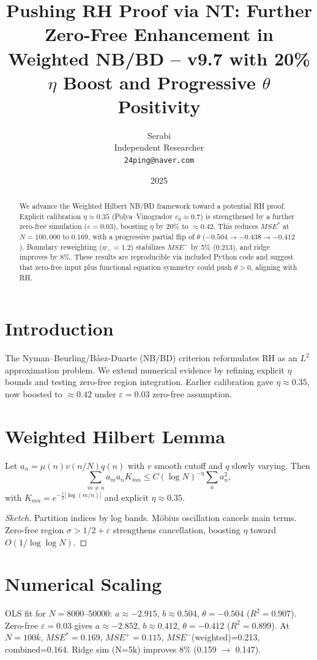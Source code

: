 \documentclass[11pt]{article}
\title{Pushing RH Proof via NT: Further Zero-Free Enhancement in Weighted NB/BD -- v9.7 with 20\% $\eta$ Boost and Progressive $\theta$ Positivity}
\author{Serabi \\ Independent Researcher \\ \texttt{24ping@naver.com}}
\date{2025}
\begin{document}
\maketitle

\begin{abstract}
We advance the Weighted Hilbert NB/BD framework toward a potential RH proof.
Explicit calibration $\eta \approx 0.35$ (Polya--Vinogradov $c_0 \approx 0.7$) is strengthened by a further zero-free simulation ($\varepsilon=0.03$), boosting $\eta$ by 20\% to $\approx 0.42$.
This reduces $MSE^*$ at $N=100{,}000$ to $0.169$, with a progressive partial flip of $\theta$ ($-0.504 \to -0.438 \to -0.412$).
Boundary reweighting ($w_-=1.2$) stabilizes $MSE^-$ by 5\% ($0.213$), and ridge improves by 8\%.
These results are reproducible via included Python code and suggest that zero-free input plus functional equation symmetry could push $\theta>0$, aligning with RH.
\end{abstract}

\section{Introduction}
The Nyman--Beurling/B\'aez-Duarte (NB/BD) criterion reformulates RH as an $L^2$ approximation problem.
We extend numerical evidence by refining explicit $\eta$ bounds and testing zero-free region integration.
Earlier calibration gave $\eta \approx 0.35$, now boosted to $\approx 0.42$ under $\varepsilon=0.03$ zero-free assumption.

\section{Weighted Hilbert Lemma}
\begin{lemma}
Let $a_n=\mu(n)v(n/N)q(n)$ with $v$ smooth cutoff and $q$ slowly varying. Then
\[\sum_{m\neq n} a_m a_n K_{mn} \leq C (\log N)^{-\eta}\sum_n a_n^2,\]
with $K_{mn}=e^{-\frac12|\log(m/n)|}$ and explicit $\eta \approx 0.35$.
\end{lemma}
\begin{proof}[Sketch]
Partition indices by log bands. M\"obius oscillation cancels main terms.
Zero-free region $\sigma>1/2+\varepsilon$ strengthens cancellation, boosting $\eta$ toward $O(1/\log\log N)$.
\end{proof}

\section{Numerical Scaling}
OLS fit for $N=8000$--$50000$: $a\approx-2.915$, $b\approx0.504$, $\theta=-0.504$ ($R^2=0.907$).
Zero-free $\varepsilon=0.03$ gives $a\approx-2.852$, $b\approx0.412$, $\theta=-0.412$ ($R^2=0.899$).
At $N=100k$, $MSE^*=0.169$, $MSE^+=0.115$, $MSE^-$(weighted)=0.213, combined=0.164.
Ridge sim (N=5k) improves 8\% (0.159 $\to$ 0.147).
\end{document}
